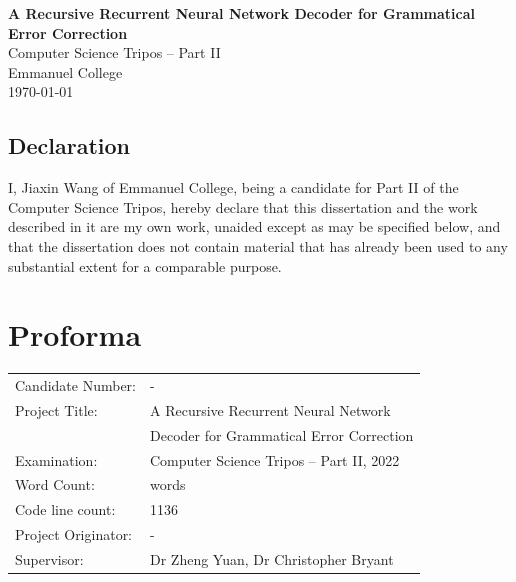 \documentclass[12pt,a4paper,twoside,openright]{report}
\newcommand{\quickwordcount}[1]{%
  \immediate\write18{texcount -1 -sum -merge -q #1.tex output.bbl > #1-words.sum }%
   words%
}
\begin{document}





\pagestyle{empty}


\vspace*{60mm}
\begin{center}
\Huge
\textbf{A Recursive Recurrent Neural Network Decoder for Grammatical Error Correction} \\[5mm]
Computer Science Tripos -- Part II \\[5mm]
Emmanuel College \\[5mm]
\today  %
\end{center}


\pagestyle{plain}

\newpage

\section*{Declaration}

I, Jiaxin Wang of Emmanuel College, being a candidate for Part II of the Computer
Science Tripos, hereby declare that this dissertation and the work described in 
it are my own work, unaided except as may be specified below, and that the dissertation
does not contain material that has already been used to any substantial
extent for a comparable purpose.

\bigskip
{}

\medskip
{}

\chapter*{Proforma}

{\large
\begin{tabular}{ll}
Candidate Number:   & -                       \\
Project Title:      & A Recursive Recurrent Neural Network \\
 & Decoder for Grammatical Error Correction \\
Examination:        & Computer Science Tripos -- Part II, 2022  \\
Word Count:         & \quickwordcount{diss}\footnotemark[1] \\
Code line count:    & 1136 \footnotemark[2]\\
Project Originator: & - \\
Supervisor:         & Dr Zheng Yuan, Dr Christopher Bryant
\end{tabular}
}
\end{document}
